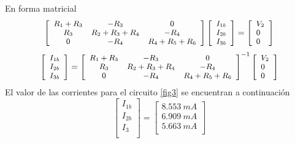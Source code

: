 \documentclass[twocolumn]{IEEEtran}
\begin{document}
\noindent
En forma matricial
\begin{equation}
\footnotesize
 \left[ {\begin{array}{*{20}{c}}
   {{R_1} + {R_3}} & { - {R_3}} & 0  \\
   {{R_3}} & {{R_2} + {R_3} + {R_4}} & { - {R_4}}  \\
   0 & { - {R_4}} & {{R_4} + {R_5} + {R_6}}  \\
\end{array}} \right]\left[ \begin{array}{l}
 {I_{1b}} \\ 
 {I_{2b}} \\ 
 {I_{3b}} \\ 
 \end{array} \right] = \left[ \begin{array}{l}
 {V_2} \\ 
 0 \\ 
 0 \\ 
 \end{array} \right]
\label{mat3}
\end{equation}
\begin{equation}
\footnotesize
 \left[ \begin{array}{l}
 {I_{1b}} \\ 
 {I_{2b}} \\ 
 {I_{3b}} \\ 
 \end{array} \right] = {\left[ {\begin{array}{*{20}{c}}
   {{R_1} + {R_3}} & { - {R_3}} & 0  \\
   {{R_3}} & {{R_2} + {R_3} + {R_4}} & { - {R_4}}  \\
   0 & { - {R_4}} & {{R_4} + {R_5} + {R_6}}  \\
\end{array}} \right]^{ - 1}}\left[ \begin{array}{l}
 {V_2} \\ 
 0 \\ 
 0 \\ 
 \end{array} \right]
\label{mat4}
\end{equation}
El valor de las corrientes para el circuito \ref{fig3} se encuentran a continuación
\begin{equation}
 \left[ \begin{array}{l}
 {I_{1b}} \\ 
 {I_{2b}} \\ 
 {I_{3}} \\ 
 \end{array} \right] = \left[ \begin{array}{l}
 8.553 \ mA \\ 
 6.909 \ mA \\ 
 5.663 \ mA \\ 
 \end{array} \right]
\end{equation}
\end{document}
